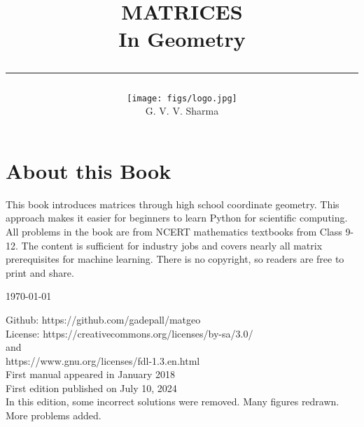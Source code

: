 \documentclass[journal]{IEEEtran}
\begin{document}

\onecolumn


\title{
	\begin{flushleft}
	MATRICES \\ In Geometry
	\\
\rule{0.4\columnwidth}{0.4pt}
\end{flushleft}
}
\author{
\vspace{7cm}
	\begin{flushleft}
\texttt{[image: figs/logo.jpg]}
\\
		{	\huge G. V. V. Sharma}
	\end{flushleft}
}
\maketitle

\newpage
\section*{About this Book}

This book introduces matrices through high school coordinate geometry. This approach makes it easier for beginners to learn Python for scientific computing. All problems in the book are from NCERT mathematics textbooks from Class 9-12.   
The content is sufficient for industry jobs and covers nearly all matrix prerequisites for machine learning.
There is no copyright, so readers are free to print and share.  
\begin{flushright}
\today
\end{flushright}
Github: https://github.com/gadepall/matgeo
		\\
License: https://creativecommons.org/licenses/by-sa/3.0/
\\
and
\\
https://www.gnu.org/licenses/fdl-1.3.en.html
\\
First manual appeared in January 2018
\\
First edition published on July 10, 2024
\\
In this edition, some incorrect solutions were removed.  Many figures redrawn. More problems added.

\newpage


\tableofcontents

\newpage
\onecolumn
\end{document}
